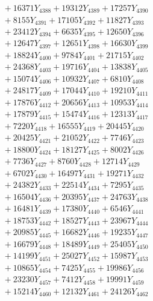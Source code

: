 \documentclass[a4paper,10pt]{article}
\begin{document}
{\begin{align}
&\;  + 16371 Y_{4388} + 19312 Y_{4389} + 17257 Y_{4390} \\[0.3ex]
&\;  + 8155 Y_{4391} + 17105 Y_{4392} + 11827 Y_{4393} \\[0.3ex]
&\;  + 23412 Y_{4394} + 6635 Y_{4395} + 12650 Y_{4396} \\[0.3ex]
&\;  + 12647 Y_{4397} + 12651 Y_{4398} + 16630 Y_{4399} \\[0.3ex]
&\;  + 18824 Y_{4400} + 9784 Y_{4401} + 21715 Y_{4402} \\[0.3ex]
&\;  + 24368 Y_{4403} + 19716 Y_{4404} + 13838 Y_{4405} \\[0.3ex]
&\;  + 15074 Y_{4406} + 10932 Y_{4407} + 6810 Y_{4408} \\[0.5ex]\allowbreak
&\;  + 24817 Y_{4409} + 17044 Y_{4410} + 19210 Y_{4411} \\[0.3ex]
&\;  + 17876 Y_{4412} + 20656 Y_{4413} + 10953 Y_{4414} \\[0.3ex]
&\;  + 17879 Y_{4415} + 15474 Y_{4416} + 12313 Y_{4417} \\[0.3ex]
&\;  + 7220 Y_{4418} + 16555 Y_{4419} + 20445 Y_{4420} \\[0.3ex]
&\;  + 20425 Y_{4421} + 21052 Y_{4422} + 7746 Y_{4423} \\[0.3ex]
&\;  + 18800 Y_{4424} + 18127 Y_{4425} + 8002 Y_{4426} \\[0.3ex]
&\;  + 7736 Y_{4427} + 8760 Y_{4428} + 12714 Y_{4429} \\[0.3ex]
&\;  + 6702 Y_{4430} + 16497 Y_{4431} + 19271 Y_{4432} \\[0.3ex]
&\;  + 24382 Y_{4433} + 22514 Y_{4434} + 7295 Y_{4435} \\[0.3ex]
&\;  + 16504 Y_{4436} + 20395 Y_{4437} + 24763 Y_{4438} \\[0.5ex]\allowbreak
&\;  + 16481 Y_{4439} + 17380 Y_{4440} + 6546 Y_{4441} \\[0.3ex]
&\;  + 18753 Y_{4442} + 18527 Y_{4443} + 23967 Y_{4444} \\[0.3ex]
&\;  + 20985 Y_{4445} + 16682 Y_{4446} + 19235 Y_{4447} \\[0.3ex]
&\;  + 16679 Y_{4448} + 18489 Y_{4449} + 25405 Y_{4450} \\[0.3ex]
&\;  + 14199 Y_{4451} + 25027 Y_{4452} + 15987 Y_{4453} \\[0.3ex]
&\;  + 10865 Y_{4454} + 7425 Y_{4455} + 19986 Y_{4456} \\[0.3ex]
&\;  + 23230 Y_{4457} + 7412 Y_{4458} + 19991 Y_{4459} \\[0.3ex]
&\;  + 15214 Y_{4460} + 12132 Y_{4461} + 24126 Y_{4462} \\[0.3ex]

\end{align}}
\end{document}
